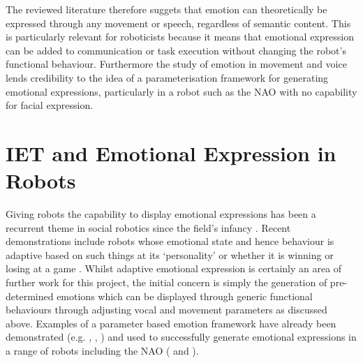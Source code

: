 \documentclass[11pt,a4paper]{report}
\begin{document}
The reviewed literature therefore suggets that emotion can theoretically be expressed through any movement or speech, regardless of semantic content. This is particularly relevant for roboticists because it means that emotional expression can be added to communication or task execution without changing the robot's functional behaviour. Furthermore the study of emotion in movement and voice lends credibility to the idea of a parameterisation framework for generating emotional expressions, particularly in a robot such as the NAO with no capability for facial expression. 

\section{IET and Emotional Expression in Robots}
Giving robots the capability to display emotional expressions has been a recurrent theme in social robotics since the field's infancy \cite{breazeal1999build}. Recent demonstrations include robots whose emotional state and hence behaviour is adaptive based on such things at its `personality' \cite{park2009robot} or whether it is winning or losing at a game \cite{tielman2014adaptive}. Whilst adaptive emotional expression is certainly an area of further work for this project, the initial concern is simply the generation of pre-determined emotions which can be displayed through generic functional behaviours through adjusting vocal and movement parameters as discussed above. Examples of a parameter based emotion framework have already been demonstrated (e.g. \cite{masuda2010motion}, \cite{lim2011converting}, \cite{xu2013mood}) and used to successfully generate emotional expressions in a range of robots including the NAO (\cite{lim2011converting} and \cite{xu2013mood}). 
\end{document}
